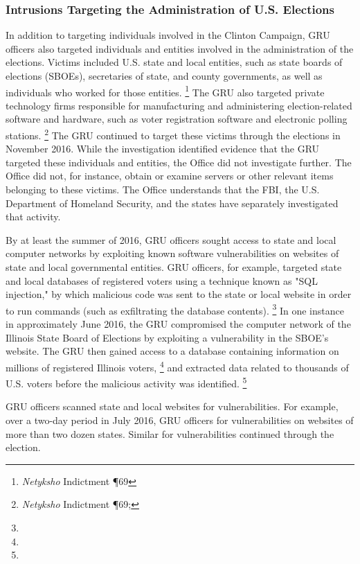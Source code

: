 \subsubsection{Intrusions Targeting the Administration of U.S. Elections}

In addition to targeting individuals involved in the Clinton Campaign, GRU officers also targeted individuals and entities involved in the administration of the elections.
Victims included U.S. state and local entities, such as state boards of elections (SBOEs), secretaries of state, and county governments, as well as individuals who worked for those entities.%
\footnote{\textit{Netyksho} Indictment \P 69}
The GRU also targeted private technology firms responsible for manufacturing and administering election-related software and hardware, such as voter registration software and electronic polling stations.%
\footnote{\textit{Netyksho} Indictment \P 69; }
The GRU continued to target these victims through the elections in November 2016.
While the investigation identified evidence that the GRU targeted these individuals and entities, the Office did not investigate further.
The Office did not, for instance, obtain or examine servers or other relevant items belonging to these victims.
The Office understands that the FBI, the U.S. Department of Homeland Security, and the states have separately investigated that activity.

By at least the summer of 2016, GRU officers sought access to state and local computer networks by exploiting known software vulnerabilities on websites of state and local governmental entities.
GRU officers, for example, targeted state and local databases of registered voters using a technique known as "SQL injection," by which malicious code was sent to the state or local website in order to run commands (such as exfiltrating the database contents).%
\footnote{}
In one instance in approximately June 2016, the GRU compromised the computer network of the Illinois State Board of Elections by exploiting a vulnerability in the SBOE's website.
The GRU then gained access to a database containing information on millions of registered Illinois voters,%
\footnote{}
and extracted data related to thousands of U.S. voters before the malicious activity was identified.%
\footnote{}

GRU officers  scanned state and local websites for vulnerabilities.
For example, over a two-day period in July 2016, GRU officers  for vulnerabilities on websites of more than two dozen states.
Similar  for vulnerabilities continued through the election.

